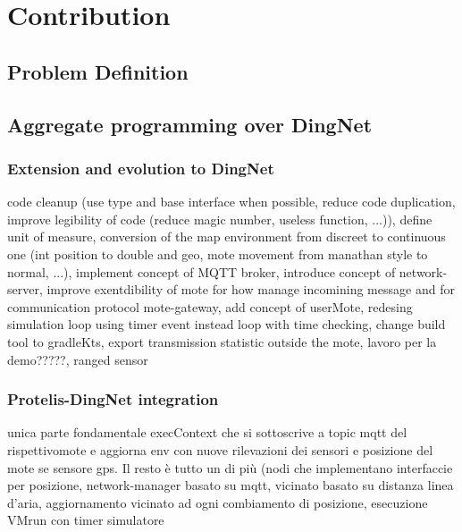 \chapter{Contribution}
\label{chap:contribution}

\section{Problem Definition}
\section{Aggregate programming over DingNet}
\subsection{Extension and evolution to DingNet}

code cleanup (use type and base interface when possible, reduce code duplication, improve legibility of code (reduce magic number, useless function, ...)), define unit of measure, conversion of the map environment from discreet to continuous one (int position to double and geo, mote movement from manathan style to normal, ...), implement concept of MQTT broker, introduce concept of network-server, improve exentdibility of mote for how manage incomining message and for communication protocol mote-gateway, add concept of userMote, redesing simulation loop using timer event instead loop with time checking, change build tool to gradleKts, export transmission statistic outside the mote, lavoro per la demo?????, ranged sensor


\subsection{Protelis-DingNet integration}

unica parte fondamentale execContext che si sottoscrive a topic mqtt del rispettivomote e aggiorna env con nuove rilevazioni dei sensori e posizione del mote se sensore gps.
Il resto è tutto un di più (nodi che implementano interfaccie per posizione, network-manager basato su mqtt, vicinato basato su distanza linea d'aria, aggiornamento vicinato ad ogni combiamento di posizione, esecuzione VMrun con timer simulatore
